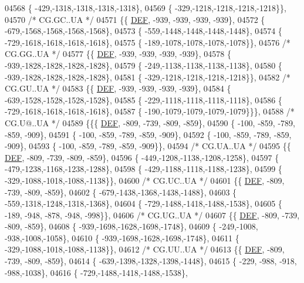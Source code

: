 \begin{DoxyCode}
04568 \{ -429,-1318,-1318,-1318,-1318\},
04569 \{ -329,-1218,-1218,-1218,-1218\}\},
04570 \textcolor{comment}{/* CG.GC..UA */}
04571 \{\{  \mbox{\hyperlink{1_88_84__epars_8h_a397419fc12b37ed479c8abb9d444d843}{DEF}}, -939, -939, -939, -939\},
04572 \{ -679,-1568,-1568,-1568,-1568\},
04573 \{ -559,-1448,-1448,-1448,-1448\},
04574 \{ -729,-1618,-1618,-1618,-1618\},
04575 \{ -189,-1078,-1078,-1078,-1078\}\},
04576 \textcolor{comment}{/* CG.GG..UA */}
04577 \{\{  \mbox{\hyperlink{1_88_84__epars_8h_a397419fc12b37ed479c8abb9d444d843}{DEF}}, -939, -939, -939, -939\},
04578 \{ -939,-1828,-1828,-1828,-1828\},
04579 \{ -249,-1138,-1138,-1138,-1138\},
04580 \{ -939,-1828,-1828,-1828,-1828\},
04581 \{ -329,-1218,-1218,-1218,-1218\}\},
04582 \textcolor{comment}{/* CG.GU..UA */}
04583 \{\{  \mbox{\hyperlink{1_88_84__epars_8h_a397419fc12b37ed479c8abb9d444d843}{DEF}}, -939, -939, -939, -939\},
04584 \{ -639,-1528,-1528,-1528,-1528\},
04585 \{ -229,-1118,-1118,-1118,-1118\},
04586 \{ -729,-1618,-1618,-1618,-1618\},
04587 \{ -190,-1079,-1079,-1079,-1079\}\}\},
04588 \textcolor{comment}{/* CG.U@..UA */}
04589 \{\{\{  \mbox{\hyperlink{1_88_84__epars_8h_a397419fc12b37ed479c8abb9d444d843}{DEF}}, -809, -739, -809, -859\},
04590 \{ -100, -859, -789, -859, -909\},
04591 \{ -100, -859, -789, -859, -909\},
04592 \{ -100, -859, -789, -859, -909\},
04593 \{ -100, -859, -789, -859, -909\}\},
04594 \textcolor{comment}{/* CG.UA..UA */}
04595 \{\{  \mbox{\hyperlink{1_88_84__epars_8h_a397419fc12b37ed479c8abb9d444d843}{DEF}}, -809, -739, -809, -859\},
04596 \{ -449,-1208,-1138,-1208,-1258\},
04597 \{ -479,-1238,-1168,-1238,-1288\},
04598 \{ -429,-1188,-1118,-1188,-1238\},
04599 \{ -329,-1088,-1018,-1088,-1138\}\},
04600 \textcolor{comment}{/* CG.UC..UA */}
04601 \{\{  \mbox{\hyperlink{1_88_84__epars_8h_a397419fc12b37ed479c8abb9d444d843}{DEF}}, -809, -739, -809, -859\},
04602 \{ -679,-1438,-1368,-1438,-1488\},
04603 \{ -559,-1318,-1248,-1318,-1368\},
04604 \{ -729,-1488,-1418,-1488,-1538\},
04605 \{ -189, -948, -878, -948, -998\}\},
04606 \textcolor{comment}{/* CG.UG..UA */}
04607 \{\{  \mbox{\hyperlink{1_88_84__epars_8h_a397419fc12b37ed479c8abb9d444d843}{DEF}}, -809, -739, -809, -859\},
04608 \{ -939,-1698,-1628,-1698,-1748\},
04609 \{ -249,-1008, -938,-1008,-1058\},
04610 \{ -939,-1698,-1628,-1698,-1748\},
04611 \{ -329,-1088,-1018,-1088,-1138\}\},
04612 \textcolor{comment}{/* CG.UU..UA */}
04613 \{\{  \mbox{\hyperlink{1_88_84__epars_8h_a397419fc12b37ed479c8abb9d444d843}{DEF}}, -809, -739, -809, -859\},
04614 \{ -639,-1398,-1328,-1398,-1448\},
04615 \{ -229, -988, -918, -988,-1038\},
04616 \{ -729,-1488,-1418,-1488,-1538\},

\end{DoxyCode}
